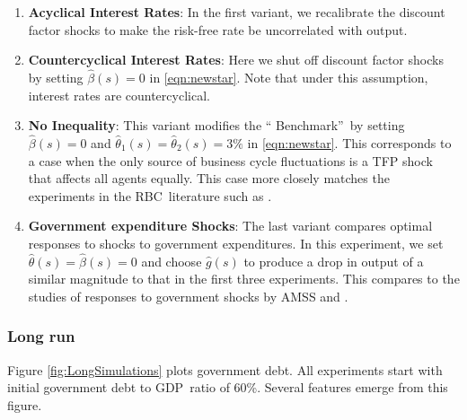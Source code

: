 \documentclass[thmsb,11pt]{article}
\begin{document}
{\begin{enumerate}
\item \textbf{Acyclical Interest Rates}: In the first variant, we recalibrate
the discount factor shocks to make the risk-free rate be uncorrelated with
output.

\item \textbf{Countercyclical Interest Rates}: Here we shut off  discount
factor shocks by setting $\hat{\beta}\left( s\right) =0$ in \eqref{eqn:newstar}. Note that under
this assumption, interest rates are countercyclical.

\item \textbf{No Inequality}: This variant modifies the \textquotedblleft
Benchmark\textquotedblright\ by setting $\hat{\beta}\left( s\right) =0$ and $%
{\hat{\theta}}_{1}(s)={\hat{\theta}}_{2}(s)=3\%$ in \eqref{eqn:newstar}. This corresponds to a case
when the only source of business cycle fluctuations is a TFP shock that
affects all agents equally. This case more closely matches the experiments
in the RBC\ literature such as \cite{Chari1994}.

\item \textbf{Government expenditure Shocks}: The last variant compares  optimal
responses to shocks to government expenditures. In this experiment, we set
$\hat{\theta}\left( s\right) =\hat{\beta}\left( s\right) =0$ and choose $%
\hat{g}\left( s\right) $ to produce a drop in output of a similar magnitude
to that in the first three experiments. This compares to the studies of
responses to government shocks by AMSS and \cite{Faraglia2011}.
\end{enumerate}

\subsubsection{Long run}

Figure \ref{fig:LongSimulations} plots government  debt. All
experiments start with initial government debt to GDP\ ratio of 60\%. Several
features emerge from this figure. %


}
\end{document}
